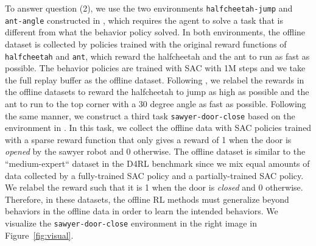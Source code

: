 To answer question (2), we use the two environments \texttt{halfcheetah-jump} and \texttt{ant-angle} constructed in \citet{yu2020mopo}, which requires the agent to solve a task that is different from what the behavior policy solved. In both environments, the offline dataset is collected by policies trained with the original reward functions of \texttt{halfcheetah} and \texttt{ant}, which reward the halfcheetah and the ant to run as fast as possible. The behavior policies are trained with SAC with 1M steps and we take the full replay buffer as the offline dataset. Following \citet{yu2020mopo}, we relabel the rewards in the offline datasets to reward the halfcheetah to jump as high as possible and the ant to run to the top corner with a 30 degree angle as fast as possible. Following the same manner, we construct a third task \texttt{sawyer-door-close} based on the environment in \citet{yu2020meta, Rafailov2020LOMPO}. In this task, we collect the offline data with SAC policies trained with a sparse reward function that only gives a reward of 1 when the door is \textit{opened} by the sawyer robot and 0 otherwise. The offline dataset is similar to the ``medium-expert`` dataset in the D4RL benchmark since we mix equal amounts of data collected by a fully-trained SAC policy and a partially-trained SAC policy. We relabel the reward such that it is 1 when the door is \textit{closed} and 0 otherwise. Therefore, in these datasets, the offline RL methods must generalize beyond behaviors in the offline data in order to learn the intended behaviors. We visualize the \texttt{sawyer-door-close} environment in the right image in Figure~\ref{fig:visual}.

\begin{table}[t]
\centering
\vspace{-0.2cm}
\caption{
\footnotesize Average returns of \texttt{halfcheetah-jump} and \texttt{ant-angle} and average success rate of \texttt{sawyer-door-close} that require out-of-distribution generalization. All results are averaged over 3 random seeds. We include the mean and max undiscounted return / success rate of the episodes in the batch data (under Batch Mean and Batch Max, respectively) for comparison.
}
\vspace*{0.2cm}
\scriptsize
{}
\vspace{-0.7cm}
\label{tbl:generalize}
\normalsize
\end{table}


